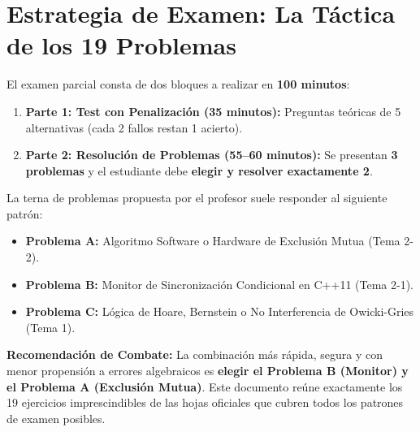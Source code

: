 \documentclass[11pt,a4paper,twoside,openright]{report}
\begin{document}
\chapter*{Estrategia de Examen: La Táctica de los 19 Problemas}

\begin{aviso}
El examen parcial consta de dos bloques a realizar en \textbf{100 minutos}:
\begin{enumerate}[leftmargin=*]
    \item \textbf{Parte 1: Test con Penalización (35 minutos):} Preguntas teóricas de 5 alternativas (cada 2 fallos restan 1 acierto).
    \item \textbf{Parte 2: Resolución de Problemas (55--60 minutos):} Se presentan \textbf{3 problemas} y el estudiante debe \textbf{elegir y resolver exactamente 2}.
\end{enumerate}

La terna de problemas propuesta por el profesor suele responder al siguiente patrón:
\begin{itemize}[leftmargin=*,noitemsep]
    \item \textbf{Problema A:} Algoritmo Software o Hardware de Exclusión Mutua (Tema 2-2).
    \item \textbf{Problema B:} Monitor de Sincronización Condicional en C++11 (Tema 2-1).
    \item \textbf{Problema C:} Lógica de Hoare, Bernstein o No Interferencia de Owicki-Gries (Tema 1).
\end{itemize}

\textbf{Recomendación de Combate:} La combinación más rápida, segura y con menor propensión a errores algebraicos es \textbf{elegir el Problema B (Monitor) y el Problema A (Exclusión Mutua)}. Este documento reúne exactamente los 19 ejercicios imprescindibles de las hojas oficiales que cubren todos los patrones de examen posibles.
\end{aviso}

\tableofcontents
\newpage

\end{document}

